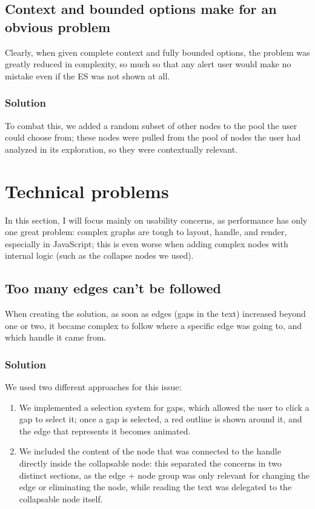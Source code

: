\documentclass{article}
\begin{document}
\subsection{Context and bounded options make for an obvious problem}
Clearly, when given complete context and fully bounded options, the problem was greatly reduced in complexity, so much so that any alert user would make no mistake even if the ES was not shown at all.
\subsubsection{Solution}
To combat this, we added a random subset of other nodes to the pool the user could choose from; these nodes were pulled from the pool of nodes the user had analyzed in its exploration, so they were contextually relevant.

\section{Technical problems}
In this section, I will focus mainly on usability concerns, as performance has only one great problem: complex graphs are tough to layout, handle, and render, especially in JavaScript; this is even worse when adding complex nodes with internal logic (such as the collapse nodes we used). 

\subsection{Too many edges can't be followed}
When creating the solution, as soon as edges (gaps in the text) increased beyond one or two, it became complex to follow where a specific edge was going to, and which handle it came from.
\subsubsection{Solution}
We used two different approaches for this issue:
\begin{enumerate}
    \item We implemented a selection system for gaps, which allowed the user to click a gap to select it; once a gap is selected, a red outline is shown around it, and the edge that represents it becomes animated.
    \item We included the content of the node that was connected to the handle directly inside the collapsable node: this separated the concerns in two distinct sections, as the edge + node group was only relevant for changing the edge or eliminating the node, while reading the text was delegated to the collapsable node itself.
\end{enumerate}
\end{document}

